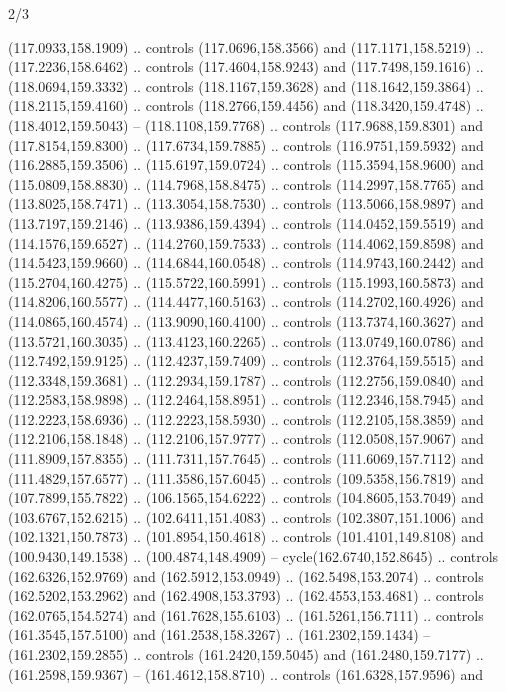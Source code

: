 \begin{flagdescription}{2/3}
\begin{scope}[shift={(0.5\flaglength,0.5)},scale=\flagwidth/320]
\begin{scope}[y=0.8pt, x=0.8pt, yscale=-1,shift={(-118.3,-146)}]
  (117.0933,158.1909) .. controls (117.0696,158.3566) and (117.1171,158.5219) ..
  (117.2236,158.6462) .. controls (117.4604,158.9243) and (117.7498,159.1616) ..
  (118.0694,159.3332) .. controls (118.1167,159.3628) and (118.1642,159.3864) ..
  (118.2115,159.4160) .. controls (118.2766,159.4456) and (118.3420,159.4748) ..
  (118.4012,159.5043) -- (118.1108,159.7768) .. controls (117.9688,159.8301) and
  (117.8154,159.8300) .. (117.6734,159.7885) .. controls (116.9751,159.5932) and
  (116.2885,159.3506) .. (115.6197,159.0724) .. controls (115.3594,158.9600) and
  (115.0809,158.8830) .. (114.7968,158.8475) .. controls (114.2997,158.7765) and
  (113.8025,158.7471) .. (113.3054,158.7530) .. controls (113.5066,158.9897) and
  (113.7197,159.2146) .. (113.9386,159.4394) .. controls (114.0452,159.5519) and
  (114.1576,159.6527) .. (114.2760,159.7533) .. controls (114.4062,159.8598) and
  (114.5423,159.9660) .. (114.6844,160.0548) .. controls (114.9743,160.2442) and
  (115.2704,160.4275) .. (115.5722,160.5991) .. controls (115.1993,160.5873) and
  (114.8206,160.5577) .. (114.4477,160.5163) .. controls (114.2702,160.4926) and
  (114.0865,160.4574) .. (113.9090,160.4100) .. controls (113.7374,160.3627) and
  (113.5721,160.3035) .. (113.4123,160.2265) .. controls (113.0749,160.0786) and
  (112.7492,159.9125) .. (112.4237,159.7409) .. controls (112.3764,159.5515) and
  (112.3348,159.3681) .. (112.2934,159.1787) .. controls (112.2756,159.0840) and
  (112.2583,158.9898) .. (112.2464,158.8951) .. controls (112.2346,158.7945) and
  (112.2223,158.6936) .. (112.2223,158.5930) .. controls (112.2105,158.3859) and
  (112.2106,158.1848) .. (112.2106,157.9777) .. controls (112.0508,157.9067) and
  (111.8909,157.8355) .. (111.7311,157.7645) .. controls (111.6069,157.7112) and
  (111.4829,157.6577) .. (111.3586,157.6045) .. controls (109.5358,156.7819) and
  (107.7899,155.7822) .. (106.1565,154.6222) .. controls (104.8605,153.7049) and
  (103.6767,152.6215) .. (102.6411,151.4083) .. controls (102.3807,151.1006) and
  (102.1321,150.7873) .. (101.8954,150.4618) .. controls (101.4101,149.8108) and
  (100.9430,149.1538) .. (100.4874,148.4909) -- cycle(162.6740,152.8645) ..
  controls (162.6326,152.9769) and (162.5912,153.0949) .. (162.5498,153.2074) ..
  controls (162.5202,153.2962) and (162.4908,153.3793) .. (162.4553,153.4681) ..
  controls (162.0765,154.5274) and (161.7628,155.6103) .. (161.5261,156.7111) ..
  controls (161.3545,157.5100) and (161.2538,158.3267) .. (161.2302,159.1434) --
  (161.2302,159.2855) .. controls (161.2420,159.5045) and (161.2480,159.7177) ..
  (161.2598,159.9367) -- (161.4612,158.8710) .. controls (161.6328,157.9596) and

\end{scope}
\end{scope}
\end{flagdescription}
